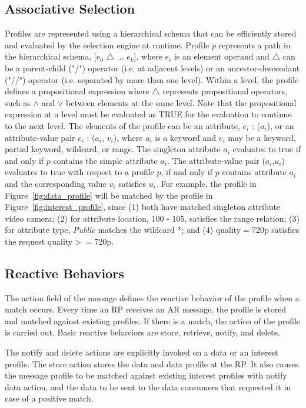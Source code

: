 \subsection{Associative Selection} 

Profiles are represented using a hierarchical schema that can be efficiently stored and evaluated by the selection engine at runtime. Profile $p$ represents a path in the hierarchical schema, [$e_0$ $\bigtriangleup$ ... $e_k$], where $e_i$ is an element operand and $\bigtriangleup$ can be a parent-child ("/") operator (i.e. at adjacent levels) or an ancestor-descendant ("//") operator (i.e. separated by more than one level). Within a level, the profile defines a propositional expression where $\bigtriangleup$ represents propositional operators, such as $\wedge$ and $\vee$ between elements at the same level. Note that the propositional expression at a level must be evaluated as TRUE for the evaluation to continue to the next level. The elements of the profile can be an attribute, $e_i$ : ($a_i$), or an attribute-value pair $e_i$ : ($a_i$, $v_i$), where $a_i$ is a keyword and $v_i$ may be a keyword, partial keyword, wildcard, or range. The singleton attribute $a_i$ evaluates to true if and only if $p$ contains the simple attribute $a_i$. The attribute-value pair ($a_i$,$u_i$) evaluates to true with respect to a profile $p$, if and only if $p$ contains attribute $a_i$ and the corresponding value $v_i$ satisfies $u_i$. For example, the profile in Figure~\ref{fig:data_profile} will be matched by the profile in Figure~\ref{fig:interest_profile}, since (1) both have matched singleton attribute video camera; (2) for attribute location, 100 - 105, satisfies the range relation; (3) for attribute type, {\it Public} matches the wildcard *; and (4) quality$=$720p satisfies the request quality$>=$720p. 

\subsection{Reactive Behaviors} 

The action field of the message defines the reactive behavior of the profile when a match occurs. Every time an RP receives an AR message, the profile is stored and matched against existing profiles. If there is a match, the action of the profile is carried out. Basic reactive behaviors are store, retrieve, notify, and delete.

The notify and delete actions are explicitly invoked on a data or an interest profile. The store
action stores the data and data profile at the RP. It also causes the message profile to be matched
against existing interest profiles with notify data action, and the data to be sent to the data consumers
that requested it in case of a positive match.

